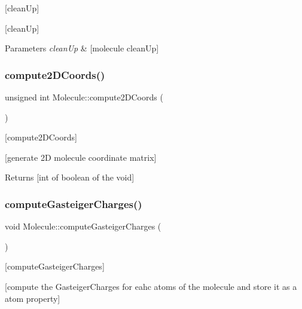 \mbox{[}clean\+Up\mbox{]} 

\mbox{[}clean\+Up\mbox{]}


\begin{DoxyParams}{Parameters}
{\em clean\+Up} & \mbox{[}molecule clean\+Up\mbox{]} \\
\hline
\end{DoxyParams}
\mbox{\label{class_molecule_a0add82d890a92f6b9cab8099becf966f}} 
\subsubsection{\texorpdfstring{compute2\+D\+Coords()}{compute2DCoords()}}
{\footnotesize\ttfamily unsigned int Molecule\+::compute2\+D\+Coords (\begin{DoxyParamCaption}{ }\end{DoxyParamCaption})}



\mbox{[}compute2\+D\+Coords\mbox{]} 

\mbox{[}generate 2D molecule coordinate matrix\mbox{]}

\begin{DoxyReturn}{Returns}
\mbox{[}int of boolean of the void\mbox{]} 
\end{DoxyReturn}
\mbox{\label{class_molecule_ad5c41d17dd1d3b564f85f97620cc508b}} 
\subsubsection{\texorpdfstring{compute\+Gasteiger\+Charges()}{computeGasteigerCharges()}}
{\footnotesize\ttfamily void Molecule\+::compute\+Gasteiger\+Charges (\begin{DoxyParamCaption}{ }\end{DoxyParamCaption})}



\mbox{[}compute\+Gasteiger\+Charges\mbox{]} 

\mbox{[}compute the Gasteiger\+Charges for eahc atoms of the molecule and store it as a atom property\mbox{]} \mbox{\label{class_molecule_a5dcf9622623a09d43d9a2bc9d381a67e}} 
